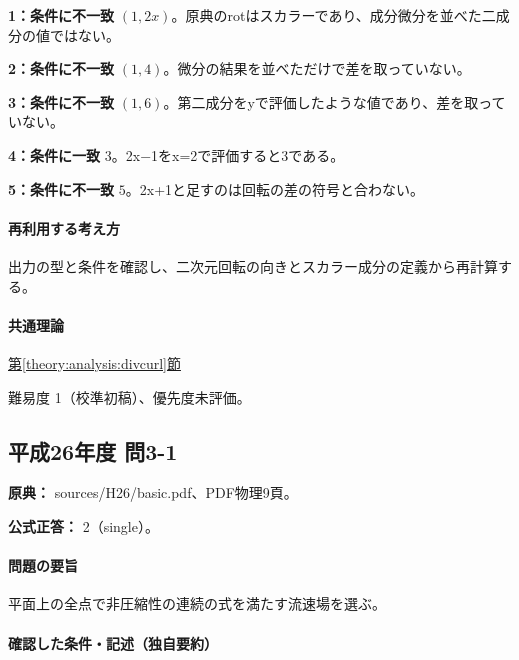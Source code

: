 \noindent\textbf{1：条件に不一致} \((1,2x)\)。原典のrotはスカラーであり、成分微分を並べた二成分の値ではない。\par

\noindent\textbf{2：条件に不一致} \((1,4)\)。微分の結果を並べただけで差を取っていない。\par

\noindent\textbf{3：条件に不一致} \((1,6)\)。第二成分をyで評価したような値であり、差を取っていない。\par

\noindent\textbf{4：条件に一致} \(3\)。2x−1をx=\allowbreak{}2で評価すると3である。\par

\noindent\textbf{5：条件に不一致} \(5\)。2x+1と足すのは回転の差の符号と合わない。\par

\paragraph{再利用する考え方} 出力の型と条件を確認し、二次元回転の向きとスカラー成分の定義から再計算する。

\paragraph{共通理論} \hyperref[theory:analysis:divcurl]{第\ref*{theory:analysis:divcurl}節}

\par 難易度 1（校準初稿）、優先度未評価。

\subsection{平成26年度 問3-1}
\label{q:h26-reg-basic-3-1}

\noindent\textbf{原典：} sources/H26/basic.pdf、PDF物理9頁。

\textbf{公式正答：} 2（single）。

\paragraph{問題の要旨} 平面上の全点で非圧縮性の連続の式を満たす流速場を選ぶ。

\paragraph{確認した条件・記述（独自要約）}\mbox{}\par

